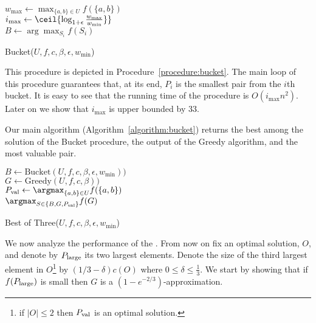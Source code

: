 \begin{procedure}
	$w_{\max} \leftarrow \max_{\{a, b\} \in U}f(\{a, b\})$
	\\
	$i_{\max} \leftarrow \ceil{\log_{1 + \epsilon}\frac{w_{\max}}{w_{\min}}\}}$
	\\
	$B \leftarrow \arg\max_{S_i}f(S_i)$
	\\
	\caption{Bucket($U, f, c, \beta, \epsilon, w_{\min}$)}
	\label{procedure:bucket}
\end{procedure}

This procedure is depicted in Procedure~\ref{procedure:bucket}.
The main loop of this procedure guarantees that, at its end, $P_i$ is the smallest pair from the $i$th bucket.
It is easy to see that the running time of the procedure is $O(i_{\max}n^2)$.
Later on we show that $i_{\max}$ is upper bounded by 33.

Our main algorithm (Algorithm~\ref{algorithm:bucket}) returns the best among the solution of the Bucket procedure, the output of the Greedy algorithm, and the most valuable pair.

\begin{algorithm}
	$B \leftarrow \text{Bucket}(U, f, c, \beta, \epsilon, w_{\min}))$
	\\
	$G \leftarrow \text{Greedy}(U, f, c, \beta))$
	\\
	$\pVal \leftarrow \argmax_{\{a, b\}\in U}f(\{a, b\})$
	\\
	\Return $\argmax_{S \in \{B, G, \pVal\}}f(G)$
	\caption{Best of Three($U, f, c, \beta, \epsilon, w_{\min}$)}
	\label{algorithm:bucket}
\end{algorithm}

We now analyze the performance of the \BOTAlg.
From now on fix an optimal solution, $O$, and denote by $P_{\text{large}}$ its two largest elements.
Denote the size of the third largest element in $O$\footnote{if $|O| \leq 2$ then $P_{\text{val}}$ is an optimal solution.} by $(1/3 - \delta)c(O)$ where $0 \leq \delta \leq \frac{1}{3}$.
We start by showing that if $f(P_{\text{large}})$ is small then $G$ is a $(1 - e^{-2/3})$-approximation.

